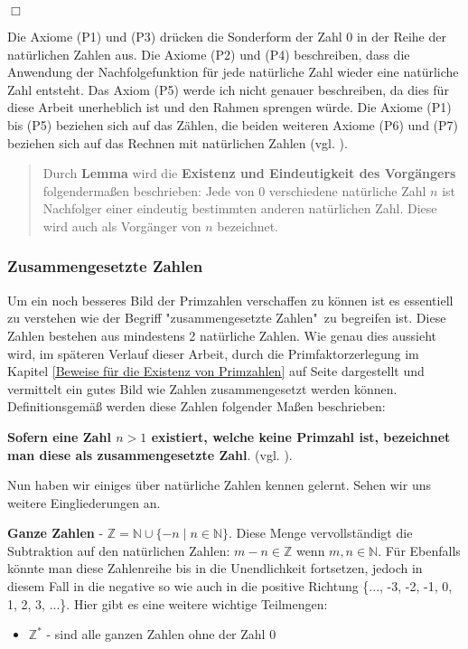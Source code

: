 \documentclass[12pt,a4paper]{article}
\theoremstyle{definition}
\begin{document}
\begin{flushright}
$\Box$
\end{flushright}
Die Axiome (P1) und (P3) drücken die Sonderform der Zahl 0 in der Reihe der natürlichen Zahlen aus.
Die Axiome (P2) und (P4) beschreiben, dass die Anwendung der Nachfolgefunktion für jede natürliche Zahl wieder eine natürliche Zahl entsteht.
Das Axiom (P5) werde ich nicht genauer beschreiben, da dies für diese Arbeit unerheblich ist und den Rahmen sprengen würde. %
Die Axiome (P1) bis (P5) beziehen sich auf das Zählen, die beiden weiteren Axiome (P6) und (P7) beziehen sich auf das Rechnen mit natürlichen Zahlen (vgl. \cite[84--85]{Steffen2013}).

\begin{quote}
\small
Durch \textbf{Lemma} %
 wird die \textbf{Existenz und Eindeutigkeit des Vorgängers} folgendermaßen beschrieben:\newline
Jede von 0 verschiedene natürliche Zahl $n$ ist Nachfolger einer eindeutig bestimmten anderen natürlichen Zahl. Diese wird auch als Vorgänger von $n$ bezeichnet.\newline
\autocite[85]{Steffen2013}
\end{quote}

\subsubsection{Zusammengesetzte Zahlen}\label{Zusammengesetzte Zahlen}
Um ein noch besseres Bild der Primzahlen verschaffen zu können ist es essentiell zu verstehen wie der Begriff "{zusammengesetzte Zahlen}"\ zu begreifen ist.
Diese Zahlen bestehen aus mindestens 2 natürliche Zahlen.
Wie genau dies aussieht wird, im späteren Verlauf dieser Arbeit, durch die Primfaktorzerlegung im Kapitel \ref{Beweise für die Existenz von Primzahlen} auf Seite \pageref{Primfaktorzerlegung} dargestellt und vermittelt ein gutes Bild wie Zahlen zusammengesetzt werden können.
Definitionsgemäß werden diese Zahlen folgender Maßen beschrieben:

\textbf{Sofern eine Zahl $n > 1$ existiert, welche keine Primzahl ist, bezeichnet man diese als zusammengesetzte Zahl}.
(vgl. \cite[13]{RempeGillen2009}).

Nun haben wir einiges über natürliche Zahlen kennen gelernt. Sehen wir uns weitere Eingliederungen an.

\textbf{Ganze Zahlen} - $\mathbb{Z} = \mathbb{N} \cup \{-n \mid n \in \mathbb{N}\}$.\newline
Diese Menge vervollständigt die Subtraktion auf den natürlichen Zahlen: $m - n \in \mathbb{Z}$ wenn $m, n \in \mathbb{N}$.
Für
Ebenfalls könnte man diese Zahlenreihe bis in die Unendlichkeit fortsetzen, jedoch in diesem Fall in die negative so wie auch in die positive Richtung \{..., -3, -2, -1, 0, 1, 2, 3, ...\}.
Hier gibt es eine weitere wichtige Teilmengen: %
\begin{itemize}
\item $\mathbb{Z}^*$ - sind alle ganzen Zahlen ohne der Zahl 0
\end{itemize}
\end{document}
